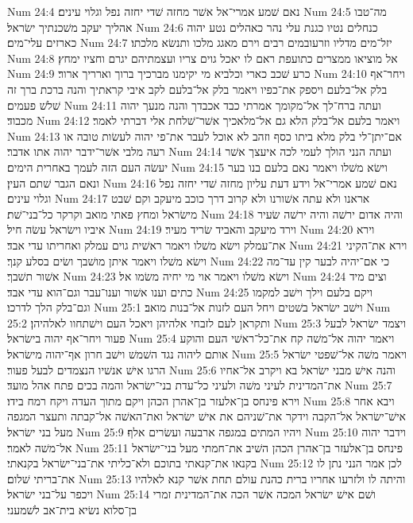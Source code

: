 Num 24:4  נאם שׁמע אמרי־אל אשׁר מחזה שׁדי יחזה נפל וגלוי עינים׃
Num 24:5  מה־טבו אהליך יעקב משׁכנתיך ישׂראל׃
Num 24:6  כנחלים נטיו כגנת עלי נהר כאהלים נטע יהוה כארזים עלי־מים׃
Num 24:7  יזל־מים מדליו וזרעובמים רבים וירם מאגג מלכו ותנשׂא מלכתו׃
Num 24:8  אל מוציאו ממצרים כתועפת ראם לו יאכל גוים צריו ועצמתיהם יגרם וחציו ימחץ׃
Num 24:9  כרע שׁכב כארי וכלביא מי יקימנו מברכיך ברוך וארריך ארור׃
Num 24:10  ויחר־אף בלק אל־בלעם ויספק את־כפיו ויאמר בלק אל־בלעם לקב איבי קראתיך והנה ברכת ברך זה שׁלשׁ פעמים׃
Num 24:11  ועתה ברח־לך אל־מקומך אמרתי כבד אכבדך והנה מנעך יהוה מכבוד׃
Num 24:12  ויאמר בלעם אל־בלק הלא גם אל־מלאכיך אשׁר־שׁלחת אלי דברתי לאמר׃
Num 24:13  אם־יתן־לי בלק מלא ביתו כסף וזהב לא אוכל לעבר את־פי יהוה לעשׂות טובה או רעה מלבי אשׁר־ידבר יהוה אתו אדבר׃
Num 24:14  ועתה הנני הולך לעמי לכה איעצך אשׁר יעשׂה העם הזה לעמך באחרית הימים׃
Num 24:15  וישׂא משׁלו ויאמר נאם בלעם בנו בער ונאם הגבר שׁתם העין׃
Num 24:16  נאם שׁמע אמרי־אל וידע דעת עליון מחזה שׁדי יחזה נפל וגלוי עינים׃
Num 24:17  אראנו ולא עתה אשׁורנו ולא קרוב דרך כוכב מיעקב וקם שׁבט מישׂראל ומחץ פאתי מואב וקרקר כל־בני־שׁת׃
Num 24:18  והיה אדום ירשׁה והיה ירשׁה שׂעיר איביו וישׂראל עשׂה חיל׃
Num 24:19  וירד מיעקב והאביד שׂריד מעיר׃
Num 24:20  וירא את־עמלק וישׂא משׁלו ויאמר ראשׁית גוים עמלק ואחריתו עדי אבד׃
Num 24:21  וירא את־הקיני וישׂא משׁלו ויאמר איתן מושׁבך ושׂים בסלע קנך׃
Num 24:22  כי אם־יהיה לבער קין עד־מה אשׁור תשׁבך׃
Num 24:23  וישׂא משׁלו ויאמר אוי מי יחיה משׂמו אל׃
Num 24:24  וצים מיד כתים וענו אשׁור וענו־עבר וגם־הוא עדי אבד׃
Num 24:25  ויקם בלעם וילך וישׁב למקמו וגם־בלק הלך לדרכו׃
Num 25:1  וישׁב ישׂראל בשׁטים ויחל העם לזנות אל־בנות מואב׃
Num 25:2  ותקראן לעם לזבחי אלהיהן ויאכל העם וישׁתחוו לאלהיהן׃
Num 25:3  ויצמד ישׂראל לבעל פעור ויחר־אף יהוה בישׂראל׃
Num 25:4  ויאמר יהוה אל־משׁה קח את־כל־ראשׁי העם והוקע אותם ליהוה נגד השׁמשׁ וישׁב חרון אף־יהוה מישׂראל׃
Num 25:5  ויאמר משׁה אל־שׁפטי ישׂראל הרגו אישׁ אנשׁיו הנצמדים לבעל פעור׃
Num 25:6  והנה אישׁ מבני ישׂראל בא ויקרב אל־אחיו את־המדינית לעיני משׁה ולעיני כל־עדת בני־ישׂראל והמה בכים פתח אהל מועד׃
Num 25:7  וירא פינחס בן־אלעזר בן־אהרן הכהן ויקם מתוך העדה ויקח רמח בידו׃
Num 25:8  ויבא אחר אישׁ־ישׂראל אל־הקבה וידקר את־שׁניהם את אישׁ ישׂראל ואת־האשׁה אל־קבתה ותעצר המגפה מעל בני ישׂראל׃
Num 25:9  ויהיו המתים במגפה ארבעה ועשׂרים אלף׃
Num 25:10  וידבר יהוה אל־משׁה לאמר׃
Num 25:11  פינחס בן־אלעזר בן־אהרן הכהן השׁיב את־חמתי מעל בני־ישׂראל בקנאו את־קנאתי בתוכם ולא־כליתי את־בני־ישׂראל בקנאתי׃
Num 25:12  לכן אמר הנני נתן לו את־בריתי שׁלום׃
Num 25:13  והיתה לו ולזרעו אחריו ברית כהנת עולם תחת אשׁר קנא לאלהיו ויכפר על־בני ישׂראל׃
Num 25:14  ושׁם אישׁ ישׂראל המכה אשׁר הכה את־המדינית זמרי בן־סלוא נשׂיא בית־אב לשׁמעני׃
